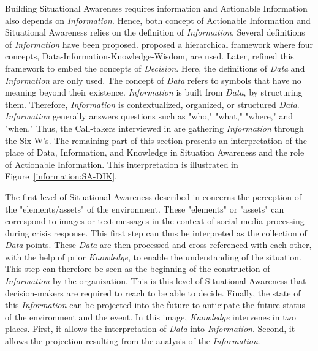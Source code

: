 Building Situational Awareness requires information and Actionable Information also depends on \textit{Information}.
Hence, both concept of Actionable Information and Situational Awareness relies on the definition of \textit{Information}.
Several definitions of \textit{Information} have been proposed.
\textcite{ackoffDataWisdom1989} proposed a hierarchical framework where four concepts, Data-Information-Knowledge-Wisdom, are used.
Later, \textcite{benabenMetamodelKnowledgeManagement2016} refined this framework to embed the concepts of \textit{Decision}.
Here, the definitions of \textit{Data} and \textit{Information} are only used.
The concept of \textit{Data} refers to symbols that have no meaning beyond their existence.
\textit{Information} is built from \textit{Data}, by structuring them.
Therefore, \textit{Information} is contextualized, organized, or structured \textit{Data}.
\textit{Information} generally answers questions such as "who," "what," "where," and "when."
Thus, the Call-takers interviewed in \textcite{kropczynskiIdentifyingActionableInformation2018} are gathering \textit{Information} through the Six W's.
The remaining part of this section presents an interpretation of the place of Data, Information, and Knowledge in Situation Awareness and the role of Actionable Information.
This interpretation is illustrated in Figure~\ref{information:SA-DIK}.

The first level of Situational Awareness described in \textcite{endsleyTheorySituationAwareness1995} concerns the perception of the "elements/assets" of the environment.
These "elements" or "assets" can correspond to images or text messages in the context of social media processing during crisis response.
This first step can thus be interpreted as the collection of \textit{Data} points.
These \textit{Data} are then processed and cross-referenced with each other, with the help of prior \textit{Knowledge}, to enable the understanding of the situation.
This step can therefore be seen as the beginning of the construction of \textit{Information} by the organization.
This is this level of Situational Awareness that decision-makers are required to reach to be able to decide.
Finally, the state of this \textit{Information} can be projected into the future to anticipate the future status of the environment and the event.
In this image, \textit{Knowledge}  intervenes in two places.
First, it allows the interpretation of \textit{Data} into \textit{Information}.
Second, it allows the projection resulting from the analysis of the \textit{Information}.

